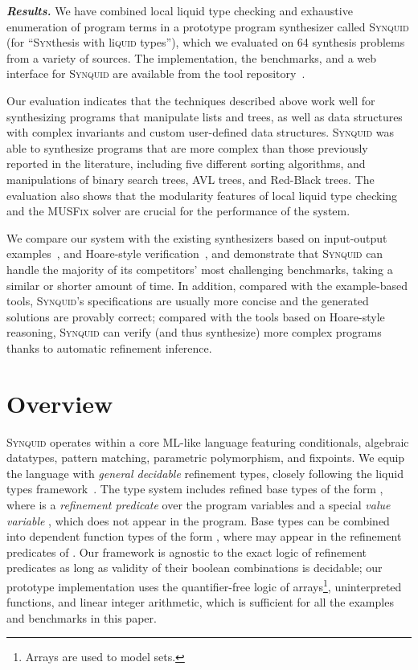 \documentclass[10pt,preprint]{sigplanconf-pldi16}
\theoremstyle{definition}
\newcommand{\custompar}[1]{\parskip 0pt \textbf{\textit{#1}}}
\newcommand{\tool}{\textsc{Synquid}\xspace}
\newcommand{\exCount}{64\xspace}
\begin{document}
\custompar{Results.}
We have combined local liquid type checking and exhaustive enumeration of program terms
in a prototype program synthesizer called \tool 
(for ``\textsc{Syn}thesis with li\textsc{quid} types''),
which we evaluated on \exCount synthesis problems from a variety of sources.
The implementation, the benchmarks, 
and a web interface for \tool are available from the tool repository~\cite{SynquidRepo}.

Our evaluation indicates that the techniques described above work well
for synthesizing programs that manipulate lists and trees, 
as well as data structures with complex invariants
and custom user-defined data structures.
\tool was able to synthesize programs that are more complex than those previously reported in the literature,
including five different sorting algorithms, and manipulations of binary search trees, AVL trees, and Red-Black trees.
The evaluation also shows that the modularity features of local liquid type checking
and the \textsc{MUSFix} solver are crucial for the performance of the system.

We compare our system with the existing synthesizers 
based on input-output examples~\cite{AlbarghouthiGuKi13,OseraZd15,FeserChDi15,FrankleOWZ16},
and Hoare-style verification~\cite{LeinoMi12,KneussKuKuSu13},
and demonstrate that \tool can handle the majority of its competitors' most challenging benchmarks,
taking a similar or shorter amount of time.
In addition, compared with the example-based tools,
\tool's specifications are usually more concise and the generated solutions are provably correct;
compared with the tools based on Hoare-style reasoning, 
\tool can verify (and thus synthesize) more complex programs thanks to automatic refinement inference.



\section{Overview}\label{sec:overview}

\tool operates within a core ML-like language featuring conditionals, algebraic datatypes, pattern matching, parametric polymorphism, and fixpoints.
We equip the language with \emph{general decidable} refinement types,
closely following the liquid types framework~\cite{RondonKaJh08,KawaguchiRoJh09,VazouRoJh13}.
The type system includes refined base types of the form ,
where  is a \emph{refinement predicate} over the program variables and a special \emph{value variable} , which does not appear in the program.
Base types can be combined into dependent function types of the form ,
where  may appear in the refinement predicates of .
Our framework is agnostic to the exact logic of refinement predicates as long as validity of their boolean combinations is decidable;
our prototype implementation uses the quantifier-free logic of arrays\footnote{Arrays are used to model sets.}, uninterpreted functions, and linear integer arithmetic,
which is sufficient for all the examples and benchmarks in this paper.
\end{document}
